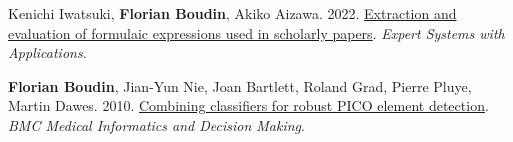 \item 
Kenichi Iwatsuki, \textbf{Florian Boudin}, Akiko Aizawa.
2022.
\href{https://doi.org/10.1016/j.eswa.2021.115840}{Extraction and evaluation of formulaic expressions used in scholarly papers}.
\textit{Expert Systems with Applications}.
\label{iwatsuki-etal-2022-extraction}

\item
\textbf{Florian Boudin}, Jian-Yun Nie, Joan Bartlett, Roland Grad, Pierre Pluye, Martin Dawes.
2010.
\href{https://doi.org/10.1186/1472-6947-10-29}{Combining classifiers for robust PICO element detection}.
\textit{BMC Medical Informatics and Decision Making}.
\label{boudin-etal-2010-combining}